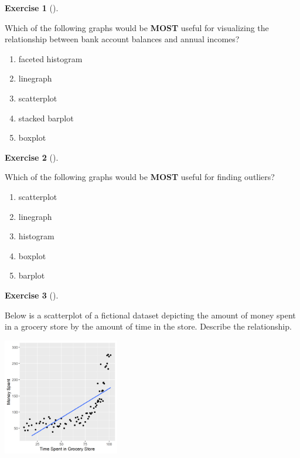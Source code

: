 \documentclass[
  letterpaper,
  DIV=11,
  numbers=noendperiod]{scrreprt}
\providecommand{\tightlist}{%
  \setlength{\itemsep}{0pt}\setlength{\parskip}{0pt}}\usepackage{longtable,booktabs,array}
\theoremstyle{definition}
\newtheorem{exercise}{Exercise}[chapter]
\theoremstyle{remark}
\begin{document}
\begin{exercise}[]\protect\hypertarget{exr-ch02-c08}{}\label{exr-ch02-c08}

Which of the following graphs would be \textbf{MOST} useful for
visualizing the relationship between bank account balances and annual
incomes?

\begin{enumerate}
\def\labelenumi{\alph{enumi})}
\tightlist
\item
  faceted histogram
\item
  linegraph
\item
  scatterplot
\item
  stacked barplot
\item
  boxplot
\end{enumerate}

\end{exercise}

\begin{exercise}[]\protect\hypertarget{exr-ch02-c09}{}\label{exr-ch02-c09}

Which of the following graphs would be \textbf{MOST} useful for finding
outliers?

\begin{enumerate}
\def\labelenumi{\alph{enumi})}
\tightlist
\item
  scatterplot
\item
  linegraph
\item
  histogram
\item
  boxplot
\item
  barplot
\end{enumerate}

\end{exercise}

\begin{exercise}[]\protect\hypertarget{exr-ch02-c10}{}\label{exr-ch02-c10}

Below is a scatterplot of a fictional dataset depicting the amount of
money spent in a grocery store by the amount of time in the store.
Describe the relationship.

\includegraphics[width=\textwidth,height=2in]{images/exercises/ch02_scatter.png}

\end{exercise}
\end{document}
